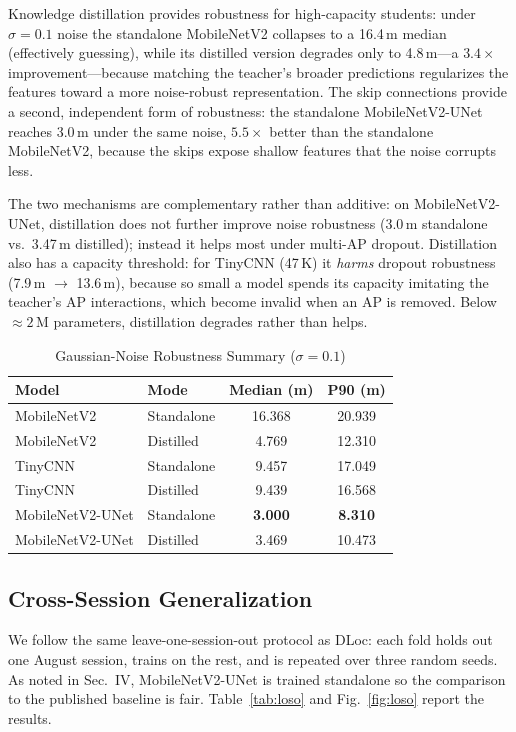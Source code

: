 \documentclass[conference]{IEEEtran}
\begin{document}
Knowledge distillation provides robustness for high-capacity students: under $\sigma=0.1$ noise the standalone MobileNetV2 collapses to a 16.4\,m median (effectively guessing), while its distilled version degrades only to 4.8\,m---a $3.4\times$ improvement---because matching the teacher's broader predictions regularizes the features toward a more noise-robust representation. The skip connections provide a second, independent form of robustness: the standalone MobileNetV2-UNet reaches 3.0\,m under the same noise, $5.5\times$ better than the standalone MobileNetV2, because the skips expose shallow features that the noise corrupts less.

The two mechanisms are complementary rather than additive: on MobileNetV2-UNet, distillation does not further improve noise robustness (3.0\,m standalone vs.\ 3.47\,m distilled); instead it helps most under multi-AP dropout. Distillation also has a capacity threshold: for TinyCNN (47\,K) it \emph{harms} dropout robustness (7.9\,m $\rightarrow$ 13.6\,m), because so small a model spends its capacity imitating the teacher's AP interactions, which become invalid when an AP is removed. Below ${\approx}2$\,M parameters, distillation degrades rather than helps.

\begin{table}[t]
\caption{Gaussian-Noise Robustness Summary ($\sigma = 0.1$)}
\label{tab:robust}
\centering
\footnotesize
\setlength{\tabcolsep}{6pt}
\begin{tabular}{@{}llcc@{}}
\toprule
\textbf{Model} & \textbf{Mode} & \textbf{Median (m)} & \textbf{P90 (m)} \\
\midrule
MobileNetV2      & Standalone & 16.368 & 20.939 \\
MobileNetV2      & Distilled  & 4.769  & 12.310 \\
TinyCNN          & Standalone & 9.457  & 17.049 \\
TinyCNN          & Distilled  & 9.439  & 16.568 \\
MobileNetV2-UNet & Standalone & \textbf{3.000} & \textbf{8.310} \\
MobileNetV2-UNet & Distilled  & 3.469  & 10.473 \\
\bottomrule
\end{tabular}
\end{table}

\subsection{Cross-Session Generalization}
\label{sec:cross}
We follow the same leave-one-session-out protocol as DLoc: each fold holds out one August session, trains on the rest, and is repeated over three random seeds. As noted in Sec.~IV, MobileNetV2-UNet is trained standalone so the comparison to the published baseline is fair. Table~\ref{tab:loso} and Fig.~\ref{fig:loso} report the results.
\end{document}
